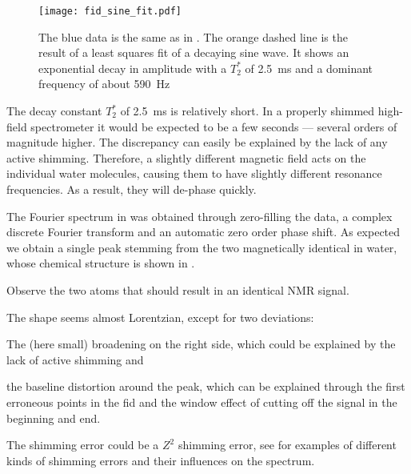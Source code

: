 \begin{figure}[h!bt]
    \centering
    \texttt{[image: fid\_sine\_fit.pdf]}
    \caption{ The blue data is the same as in . The orange dashed line is the result of a least squares fit of a decaying sine wave. It shows an exponential decay in amplitude with a $T_2^*$ of \qty{2.5}{\milli\second} and a dominant frequency of about \qty{590}{\hertz}}
\end{figure}

The decay constant \(T_2^*\) of \qty{2.5}{\milli\second} is relatively short. In a properly shimmed high-field spectrometer it would be expected to be a few seconds --- several orders of magnitude higher. The discrepancy can easily be explained by the lack of any active shimming. Therefore, a slightly different magnetic field acts on the individual water molecules, causing them to have slightly different resonance frequencies. As a result, they will de-phase quickly.

The Fourier spectrum in  was obtained through zero-filling the data, a complex discrete Fourier transform and an automatic zero order phase shift. As expected we obtain a single peak stemming from the two magnetically identical  in water, whose chemical structure is shown in .

\begin{marginfigure}
    \centering
    
    \caption{ Observe the two  atoms that should result in an identical NMR signal.}
\end{marginfigure}

The shape seems almost Lorentzian, except for two deviations: %
\begin{enumerate*}[label=(\arabic*)]
    \item The (here small) broadening on the right side, which could be explained by the lack of active shimming and
    \item the baseline distortion around the peak, which can be explained through the first erroneous points in the \acrshort{fid} and the window effect of cutting off the signal in the beginning and end.
\end{enumerate*}%
The shimming error could be a \(Z^2\) shimming error, see  for examples of different kinds of shimming errors and their influences on the spectrum.

